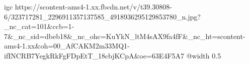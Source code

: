  
 
 
 
 

\qqSecCmt


\ifcmt
  igc https://scontent-ams4-1.xx.fbcdn.net/v/t39.30808-6/323717281_2296911357137585_4918936295129853780_n.jpg?_nc_cat=101&ccb=1-7&_nc_sid=dbeb18&_nc_ohc=KuYkN_ltM4sAX9fa4fF&_nc_ht=scontent-ams4-1.xx&oh=00_AfCAKM2m33MQ1-ifINCRB7YegkRkFgFDpEtT_18cbjKCpA&oe=63E4F5A7
	@width 0.5
\fi


